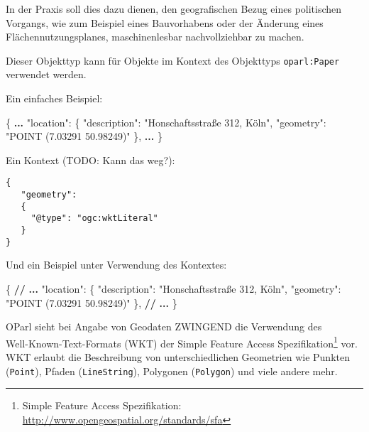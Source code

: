 \documentclass[,a4paper]{article}
\newenvironment{Shaded}{}{}
\newcommand{\DataTypeTok}[1]{\textcolor[rgb]{0.56,0.13,0.00}{{#1}}}
\newcommand{\StringTok}[1]{\textcolor[rgb]{0.25,0.44,0.63}{{#1}}}
\newcommand{\ErrorTok}[1]{\textcolor[rgb]{1.00,0.00,0.00}{\textbf{{#1}}}}
\newcommand{\NormalTok}[1]{{#1}}
\begin{document}
In der Praxis soll dies dazu dienen, den geografischen Bezug eines
politischen Vorgangs, wie zum Beispiel eines Bauvorhabens oder der
Änderung eines Flächennutzungsplanes, maschinenlesbar nachvollziehbar zu
machen.

Dieser Objekttyp kann für Objekte im Kontext des Objekttyps
\texttt{oparl:Paper} verwendet werden.

Ein einfaches Beispiel:

\begin{Shaded}
\begin{Highlighting}[]
\NormalTok{\{}
    \ErrorTok{...}
    \DataTypeTok{"location"}\NormalTok{: \{}
        \DataTypeTok{"description"}\NormalTok{: }\StringTok{"Honschaftsstraße 312, Köln"}\NormalTok{,}
        \DataTypeTok{"geometry"}\NormalTok{: }\StringTok{"POINT (7.03291 50.98249)"}
    \NormalTok{\},}
    \ErrorTok{...}
\NormalTok{\}}
\end{Highlighting}
\end{Shaded}

Ein Kontext (TODO: Kann das weg?):

\begin{verbatim}
{
   "geometry":
   {
     "@type": "ogc:wktLiteral" 
   }
}
\end{verbatim}

Und ein Beispiel unter Verwendung des Kontextes:

\begin{Shaded}
\begin{Highlighting}[]
\NormalTok{\{}
    \ErrorTok{//} \ErrorTok{...}
    \DataTypeTok{"location"}\NormalTok{: \{}
        \DataTypeTok{"description"}\NormalTok{: }\StringTok{"Honschaftsstraße 312, Köln"}\NormalTok{,}
        \DataTypeTok{"geometry"}\NormalTok{: }\StringTok{"POINT (7.03291 50.98249)"}
    \NormalTok{\},}
    \ErrorTok{//} \ErrorTok{...}
\NormalTok{\}}
\end{Highlighting}
\end{Shaded}

OParl sieht bei Angabe von Geodaten ZWINGEND die Verwendung
des\\Well-Known-Text-Formats (WKT) der Simple Feature Access
Spezifikation\footnote{Simple Feature Access Spezifikation:
  \url{http://www.opengeospatial.org/standards/sfa}} vor. WKT erlaubt
die Beschreibung von unterschiedlichen Geometrien wie Punkten
(\texttt{Point}), Pfaden (\texttt{LineString}), Polygonen
(\texttt{Polygon}) und viele andere mehr.
\end{document}
